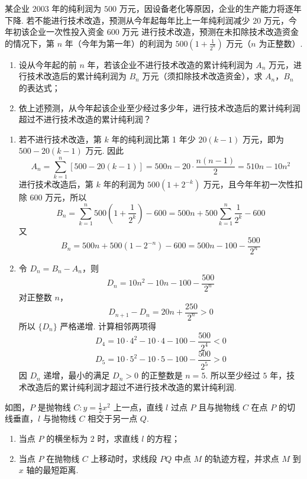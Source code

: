 \begin{problem}
某企业 \(2003\) 年的纯利润为 \(500\text{ 万元}\)，因设备老化等原因，企业的生产能力将逐年下降. 若不能进行技术改造，预测从今年起每年比上一年纯利润减少 \(20\text{ 万元}\)，今年初该企业一次性投入资金 \(600\text{ 万元}\) 进行技术改造，预测在未扣除技术改造资金的情况下，第 \(n\) 年（今年为第一年）的利润为 \(500\left(1 + \frac{1}{2^{n}}\right)\text{ 万元}\)（\(n\) 为正整数）.

\begin{enumerate}
\item 设从今年起的前 \(n\) 年，若该企业不进行技术改造的累计纯利润为 \(A_n\text{ 万元}\)，进行技术改造后的累计纯利润为 \(B_n\text{ 万元}\)（须扣除技术改造资金），求 \(A_n\)，\(B_n\) 的表达式；
\item 依上述预测，从今年起该企业至少经过多少年，进行技术改造后的累计纯利润超过不进行技术改造的累计纯利润？
\end{enumerate}
\end{problem}

\begin{solution}
\begin{enumerate}
\item 若不进行技术改造，第 \(k\) 年的纯利润比第 1 年少 \(20(k-1)\) 万元，即为 \(500-20(k-1)\) 万元. 因此
\[
A_n=\sum_{k=1}^{n}[500-20(k-1)]
=500n-20\cdot\frac{n(n-1)}2
=510n-10n^2
\]
进行技术改造后，第 \(k\) 年的利润为 \(500(1+2^{-k})\) 万元，且今年年初一次性扣除 \(600\) 万元，所以
\[
B_n=\sum_{k=1}^{n}500\left(1+\frac1{2^k}\right)-600
=500n+500\sum_{k=1}^{n}\frac1{2^k}-600
\]
又
\[
B_n=500n+500(1-2^{-n})-600
=500n-100-\frac{500}{2^n}
\]
\item 令 \(D_n=B_n-A_n\)，则
\[
D_n=10n^2-10n-100-\frac{500}{2^n}
\]
对正整数 \(n\)，
\[
D_{n+1}-D_n=20n+\frac{250}{2^n}>0
\]
所以 \(\{D_n\}\) 严格递增. 计算相邻两项得
\[
D_4=10\cdot4^2-10\cdot4-100-\frac{500}{2^4}<0
\]
\[
D_5=10\cdot5^2-10\cdot5-100-\frac{500}{2^5}>0
\]
因 \(D_n\) 递增，最小的满足 \(D_n>0\) 的正整数是 \(n=5\). 所以至少经过 \(5\) 年，技术改造后的累计纯利润才超过不进行技术改造的累计纯利润.
\end{enumerate}
\end{solution}

\begin{problem}
如图，\(P\) 是抛物线 \(C: y = \frac{1}{2}x^2\) 上一点，直线 \(l\) 过点 \(P\) 且与抛物线 \(C\) 在点 \(P\) 的切线垂直，\(l\) 与抛物线 \(C\) 相交于另一点 \(Q\).

\begin{enumerate}
\item 当点 \(P\) 的横坐标为 \(2\) 时，求直线 \(l\) 的方程；
\item 当点 \(P\) 在抛物线 \(C\) 上移动时，求线段 \(PQ\) 中点 \(M\) 的轨迹方程，并求点 \(M\) 到 \(x\) 轴的最短距离.
\end{enumerate}

\end{problem}

